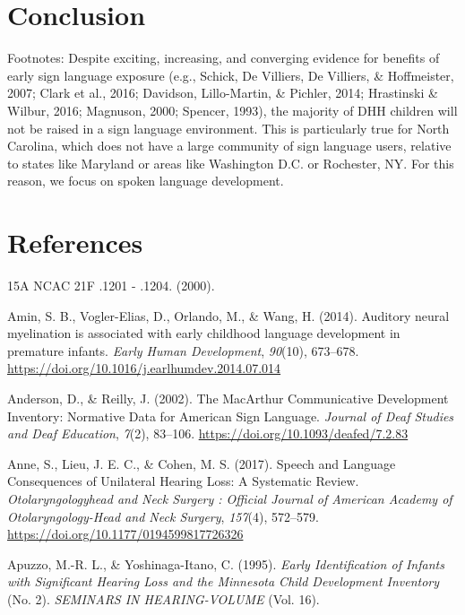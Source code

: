 \documentclass[english,man]{apa6}
\begin{document}
\hypertarget{conclusion}{%
\section{Conclusion}\label{conclusion}}

Footnotes: Despite exciting, increasing, and converging evidence for benefits of early sign language exposure (e.g., Schick, De Villiers, De Villiers, \& Hoffmeister, 2007; Clark et al., 2016; Davidson, Lillo-Martin, \& Pichler, 2014; Hrastinski \& Wilbur, 2016; Magnuson, 2000; Spencer, 1993), the majority of DHH children will not be raised in a sign language environment. This is particularly true for North Carolina, which does not have a large community of sign language users, relative to states like Maryland or areas like Washington D.C. or Rochester, NY. For this reason, we focus on spoken language development.

\hypertarget{references}{%
\section*{References}\label{references}}

\hypertarget{refs}{}
\leavevmode\hypertarget{ref-2000}{}%
15A NCAC 21F .1201 - .1204. (2000).

\leavevmode\hypertarget{ref-amin2014}{}%
Amin, S. B., Vogler-Elias, D., Orlando, M., \& Wang, H. (2014). Auditory neural myelination is associated with early childhood language development in premature infants. \emph{Early Human Development}, \emph{90}(10), 673--678. \url{https://doi.org/10.1016/j.earlhumdev.2014.07.014}

\leavevmode\hypertarget{ref-anderson2002}{}%
Anderson, D., \& Reilly, J. (2002). The MacArthur Communicative Development Inventory: Normative Data for American Sign Language. \emph{Journal of Deaf Studies and Deaf Education}, \emph{7}(2), 83--106. \url{https://doi.org/10.1093/deafed/7.2.83}

\leavevmode\hypertarget{ref-anne2017}{}%
Anne, S., Lieu, J. E. C., \& Cohen, M. S. (2017). Speech and Language Consequences of Unilateral Hearing Loss: A Systematic Review. \emph{Otolaryngologyhead and Neck Surgery : Official Journal of American Academy of Otolaryngology-Head and Neck Surgery}, \emph{157}(4), 572--579. \url{https://doi.org/10.1177/0194599817726326}

\leavevmode\hypertarget{ref-apuzzo1995}{}%
Apuzzo, M.-R. L., \& Yoshinaga-Itano, C. (1995). \emph{Early Identification of Infants with Significant Hearing Loss and the Minnesota Child Development Inventory} (No. 2). \emph{SEMINARS IN HEARING-VOLUME} (Vol. 16).
\end{document}
